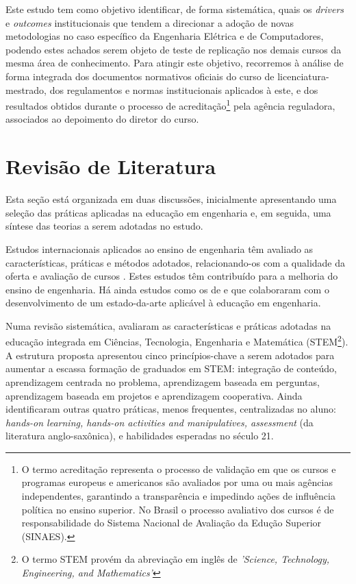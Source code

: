 \documentclass{textolivre-html}
\begin{document}
Este estudo tem como objetivo identificar, de forma sistemática, quais os \textit{drivers} e \textit{outcomes} institucionais que tendem a direcionar a adoção de novas metodologias no caso específico da Engenharia Elétrica e de Computadores, podendo estes achados serem objeto de teste de replicação nos demais cursos da mesma área de conhecimento. Para atingir este objetivo, recorremos à análise de forma integrada dos documentos normativos oficiais do curso de licenciatura-mestrado, dos regulamentos e normas institucionais aplicados à este, e dos resultados obtidos durante o processo de acreditação\footnote{O termo acreditação representa o processo de validação em que os cursos e programas europeus e americanos são avaliados por uma ou mais agências independentes, garantindo a transparência e impedindo ações de influência política no ensino superior. No Brasil o processo avaliativo dos cursos é de responsabilidade do Sistema Nacional de Avaliação da Edução Superior (SINAES).} pela agência reguladora, associados ao depoimento do diretor do curso.

\section{Revisão de Literatura}\label{sec-revisao}
Esta seção está organizada em duas discussões, inicialmente apresentando uma seleção das práticas aplicadas na educação em engenharia e, em seguida, uma síntese das teorias a serem adotadas no estudo.

Estudos internacionais aplicados ao ensino de engenharia têm avaliado as características, práticas e métodos adotados, relacionando-os com a qualidade da oferta e avaliação de cursos \cite{eldin2018,li2020,thibaut2018}. Estes estudos têm contribuído para a melhoria do ensino de engenharia. Há ainda estudos como os de \textcite{graham2018} e \textcite{manzoor2017} que colaboraram com o desenvolvimento de um estado-da-arte aplicável à educação em engenharia.

Numa revisão sistemática, \cite{thibaut2018} avaliaram as características e práticas adotadas na educação integrada em Ciências, Tecnologia, Engenharia e Matemática (STEM\footnote{O termo STEM provém da abreviação em inglês de \textit{'Science, Technology, Engineering, and Mathematics'}}). A estrutura proposta apresentou cinco princípios-chave a serem adotados para aumentar a escassa formação de graduados em STEM: integração de conteúdo, aprendizagem centrada no problema, aprendizagem baseada em perguntas, aprendizagem baseada em projetos e aprendizagem cooperativa. Ainda identificaram outras quatro práticas, menos frequentes, centralizadas no aluno: \textit{hands-on learning, hands-on activities and manipulatives, assessment} (da literatura anglo-saxônica), e habilidades esperadas no século 21.
\end{document}
